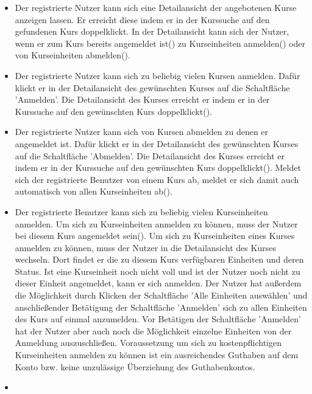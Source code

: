 \documentclass[a4paper]{scrreprt}
\begin{document}
\begin{itemize}
	\item {}
	Der registrierte Nutzer kann sich eine Detailansicht der angebotenen Kurse anzeigen lassen. Er erreicht diese indem er in der Kurssuche auf den gefundenen Kurs doppelklickt. In der Detailansicht kann sich der Nutzer, wenn er zum Kurs bereits angemeldet ist() zu Kurseinheiten anmelden() oder von Kurseinheiten abmelden().
	\item {} 
	Der registrierte Nutzer kann sich zu beliebig vielen Kursen anmelden. 
	Dafür klickt er in der Detailansicht des gewünschten Kurses auf die Schaltfläche 'Anmelden'. Die Detailansicht des Kurses erreicht er indem er in der Kurssuche auf den gewünschten Kurs doppelklickt().
	\item {} 
	Der registrierte Nutzer kann sich von Kursen abmelden zu denen er angemeldet ist. Dafür klickt er in der Detailansicht des gewünschten Kurses auf die Schaltfläche 'Abmelden'. Die Detailansicht des Kurses erreicht er indem er in der Kurssuche auf den gewünschten Kurs doppelklickt(). Meldet sich der registrierte Benutzer von einem Kurs ab, meldet er sich damit auch automatisch von allen Kurseinheiten ab().
	\item {}
	Der registrierte Benutzer kann sich zu beliebig vielen Kurseinheiten anmelden. Um sich zu Kurseinheiten anmelden zu können, muss der Nutzer bei diesem Kurs angemeldet sein().
	Um sich zu Kurseinheiten eines Kurses anmelden zu können, muss der Nutzer in die Detailansicht des Kurses wechseln. Dort findet er die zu diesem Kurs verfügbaren Einheiten und deren Status. Ist eine Kurseinheit noch nicht voll und ist der Nutzer noch nicht zu dieser Einheit angemeldet, kann er sich anmelden. Der Nutzer hat außerdem die Möglichkeit durch Klicken der Schaltfläche 'Alle Einheiten auswählen' und anschließender Betätigung der Schaltfläche 'Anmelden' sich zu allen Einheiten des Kurs auf einmal anzumelden. Vor Betätigen der Schaltfläche 'Anmelden' hat der Nutzer aber auch noch die Möglichkeit einzelne Einheiten von der Anmeldung auszuschließen. Voraussetzung um sich zu kostenpflichtigen Kurseinheiten anmelden zu können ist ein ausreichendes Guthaben auf dem Konto bzw. keine unzulässige Überziehung des Guthabenkontos.
	\item {}

\end{itemize}
\end{document}
